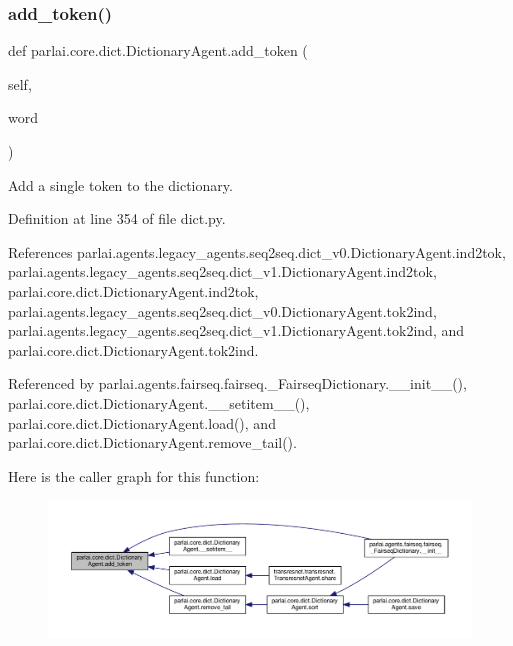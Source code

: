 \subsubsection{\texorpdfstring{add\+\_\+token()}{add\_token()}}
{\footnotesize\ttfamily def parlai.\+core.\+dict.\+Dictionary\+Agent.\+add\+\_\+token (\begin{DoxyParamCaption}\item[{}]{self,  }\item[{}]{word }\end{DoxyParamCaption})}

\begin{DoxyVerb}Add a single token to the dictionary.\end{DoxyVerb}
 

Definition at line 354 of file dict.\+py.



References parlai.\+agents.\+legacy\+\_\+agents.\+seq2seq.\+dict\+\_\+v0.\+Dictionary\+Agent.\+ind2tok, parlai.\+agents.\+legacy\+\_\+agents.\+seq2seq.\+dict\+\_\+v1.\+Dictionary\+Agent.\+ind2tok, parlai.\+core.\+dict.\+Dictionary\+Agent.\+ind2tok, parlai.\+agents.\+legacy\+\_\+agents.\+seq2seq.\+dict\+\_\+v0.\+Dictionary\+Agent.\+tok2ind, parlai.\+agents.\+legacy\+\_\+agents.\+seq2seq.\+dict\+\_\+v1.\+Dictionary\+Agent.\+tok2ind, and parlai.\+core.\+dict.\+Dictionary\+Agent.\+tok2ind.



Referenced by parlai.\+agents.\+fairseq.\+fairseq.\+\_\+\+Fairseq\+Dictionary.\+\_\+\+\_\+init\+\_\+\+\_\+(), parlai.\+core.\+dict.\+Dictionary\+Agent.\+\_\+\+\_\+setitem\+\_\+\+\_\+(), parlai.\+core.\+dict.\+Dictionary\+Agent.\+load(), and parlai.\+core.\+dict.\+Dictionary\+Agent.\+remove\+\_\+tail().

Here is the caller graph for this function\+:
\nopagebreak
\begin{figure}[H]
\begin{center}
\leavevmode
\includegraphics[width=350pt]{classparlai_1_1core_1_1dict_1_1DictionaryAgent_aec44508e4b501214618e24d86a4a51df_icgraph}
\end{center}
\end{figure}
\mbox{\label{classparlai_1_1core_1_1dict_1_1DictionaryAgent_a520e4bc630cd60f075ad21632ef677a1}} 
